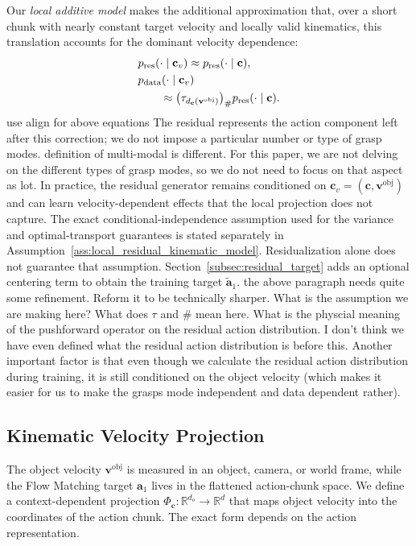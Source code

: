 \documentclass[10pt,twocolumn,letterpaper]{article}
\newcommand{\EditAP}[1]{{\color{blue} #1}}
\begin{document}
Our \emph{local additive model} makes the additional approximation that,
over a short chunk with nearly constant target velocity and locally valid
kinematics, this translation accounts for the dominant velocity dependence:
\begin{align}
    &p_{\mathrm{res}}(\cdot\mid\mathbf c_v)
    \approx p_{\mathrm{res}}(\cdot\mid\mathbf c), \notag\\
    &p_{\mathrm{data}}(\cdot\mid\mathbf c_v) \notag\\
    &\qquad\approx\bigl(\tau_{d_{\mathbf c}(\mathbf v^{\mathrm{obj}})}\bigr)_{\#}
    p_{\mathrm{res}}(\cdot\mid\mathbf c).
    \label{eq:velocity_pushforward_model}
\end{align}
\EditAP{use align for above equations}
The residual represents the action component left after this correction;
we do not impose a particular number or type of grasp modes. \EditAP{definition of multi-modal is different. For this paper, we are not delving on the different types of grasp modes, so we do not need to focus on that aspect as lot.}
In practice, the residual generator remains conditioned on
$\mathbf c_v=(\mathbf c,\mathbf v^{\mathrm{obj}})$ and can learn
velocity-dependent effects that the local projection does not capture.
The exact conditional-independence assumption used for the variance and
optimal-transport guarantees is stated separately in
Assumption~\ref{ass:local_residual_kinematic_model}. Residualization alone
does not guarantee that assumption. Section~\ref{subsec:residual_target}
adds an optional centering term to obtain the training target
$\widetilde{\mathbf a}_1$.
\EditAP{the above paragraph needs quite some refinement. Reform it to be technically sharper. What is the assumption we are making here? What does $\tau$ and $\#$ mean here. What is the physcial meaning of the pushforward operator on the residual action distribution. I don't think we have even defined what the residual action distribution is before this. Another important factor is that even though we calculate the residual action distribution during training, it is still conditioned on the object velocity (which makes it easier for us to make the grasps mode independent and data dependent rather).}

\subsection{Kinematic Velocity Projection}
\label{subsec:kinematic_projection}

The object velocity $\mathbf v^{\mathrm{obj}}$ is measured in an object, camera, or world
frame, while the Flow Matching target $\mathbf a_1$ lives in the flattened
action-chunk space. We define a context-dependent projection
$\Phi_{\mathbf c}:\mathbb R^{d_o}\rightarrow\mathbb R^d$ that maps object
velocity into the coordinates of the action chunk. The exact form depends on the
action representation.
\end{document}
